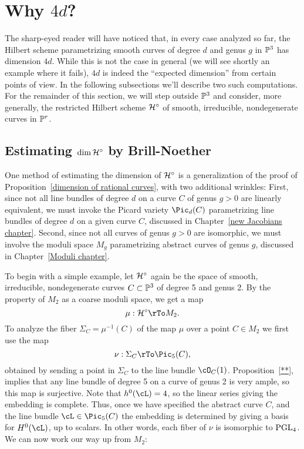 \section{Why  $4d$?}\label{estimating dim hilb}

The sharp-eyed reader will have noticed that, in every case analyzed so far,  the Hilbert scheme parametrizing smooth curves of degree $d$ and genus $g$ in $\PP^3$ has dimension $4d$. While this is not the case in general (we will see shortly an example where it fails), $4d$ is indeed the ``expected dimension'' from certain points of view. In the following subsections we'll describe two such computations. For the remainder of this section, we will step outside $\PP^3$ and consider, more generally, the restricted Hilbert scheme $\cH^\circ$ of smooth, irreducible, nondegenerate curves in $\PP^r$.

\subsection{Estimating $\dim \cH^\circ$ by Brill-Noether}

One method of estimating  the dimension of $\cH^\circ$ is a generalization of the proof of Proposition~\ref{dimension of rational curves}, with two additional wrinkles: First, since not all line bundles of degree $d$ on a curve $C$ of genus $g > 0$ are linearly equivalent, we must invoke the Picard variety $\Pic_d(C)$ parametrizing line bundles of degree $d$ on a given curve $C$, discussed in Chapter~\ref{new Jacobians chapter}. Second, since not all curves of genus $g > 0$ are isomorphic, we must involve the moduli space  $M_g$ parametrizing abstract curves of genus $g$, discussed in Chapter~\ref{Moduli chapter}.

To begin with a simple example, let $\cH^\circ$ again be the space of smooth, irreducible, nondegenerate curves $C \subset \PP^3$ of degree 5 and genus 2. By the property of $M_{2}$ as a coarse moduli space, we get a map
$$
\mu : \cH^\circ \rTo M_2.
$$
To analyze the fiber $\Sigma_C =\mu^{-1}(C)$ of the map $\mu$ over a point $C \in M_2$ we first use the map
$$
\nu : \Sigma_C \rTo \Pic_5(C),
$$
obtained by sending a point in $\Sigma_C$ to the line bundle $\cO_C(1)$. Proposition~\ref{**}, implies that any line bundle of degree 5 on a curve of genus 2 is very ample, so this map is surjective. Note that 
$h^0(\cL) = 4$, so the linear series  giving the embedding is complete. Thus, once we have specified the abstract curve $C$, and the line bundle $\cL \in \Pic_5(C)$ the embedding is determined by giving a basis for $H^0(\cL)$, up to scalars. In other words, each fiber of $\nu$ is isomorphic to $\PGL_4$. We can now work our way up from $M_2$:

